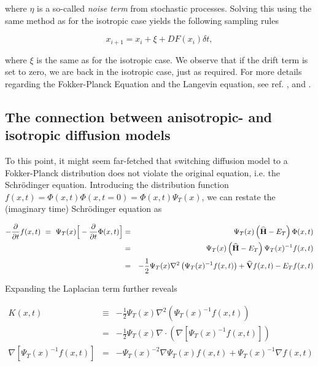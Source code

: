where $\eta$ is a so-called \textit{noise term} from stochastic processes. Solving this using the same method as for the isotropic case yields the following sampling rules

\begin{equation}
 \label{eq:langevinSolFP}
 x_{i+1} = x_i + \xi + DF(x_i)\delta t,
\end{equation}

where $\xi$ is the same as for the isotropic case. We observe that if the drift term is set to zero, we are back in the isotropic case, just as required. For more details regarding the Fokker-Planck Equation and the Langevin equation, see ref. \cite{Gardiner:2004bk}, \cite{risken1989fpe} and \cite{langevin}.


\subsection{The connection between anisotropic- and isotropic diffusion models}
\label{sec:ConnectAnisIs}

To this point, it might seem far-fetched that switching diffusion model to a Fokker-Planck distribution does not violate the original equation, i.e. the Schrödinger equation. Introducing the distribution function $f(x, t) = \Phi(x, t)\Phi(x, t=0) = \Phi(x, t)\Psi_T(x)$, we can restate the (imaginary time) Schrödinger equation as

\begin{eqnarray}
-\frac{\partial}{\partial t}f(x, t)\,\, = \,\,\Psi_T(x)\Big[-\frac{\partial}{\partial t}\Phi(x, t)\Big] &=& \Psi_T(x)\left({\bf\widehat{H}} - E_T\right)\Phi(x, t) \nonumber\\
         &=& \Psi_T(x)\left({\bf\widehat{H}} - E_T\right)\Psi_T(x)^{-1}f(x, t) \label{eq:impSamplRaw}\\
         &=& -\frac{1}{2}\Psi_T(x)\nabla^2 \left(\Psi_T(x)^{-1}f(x, t)\right) + {\bf\widehat{V}}f(x, t) - E_Tf(x,t)\nonumber
\end{eqnarray}

Expanding the Laplacian term further reveals

\begin{eqnarray}
K(x, t) &\equiv& -\frac{1}{2}\Psi_T(x)\nabla^2 \left(\Psi_T(x)^{-1}f(x, t)\right) \nonumber\\
 &=& -\frac{1}{2}\Psi_T(x)\nabla\cdot (\nabla\left[\Psi_T(x)^{-1}f(x, t)\right]) \\
\nabla\left[\Psi_T(x)^{-1}f(x, t)\right] &=& -\Psi_T(x)^{-2}\nabla \Psi_T(x) f(x, t) + \Psi_T(x)^{-1}\nabla f(x, t)
\end{eqnarray}

